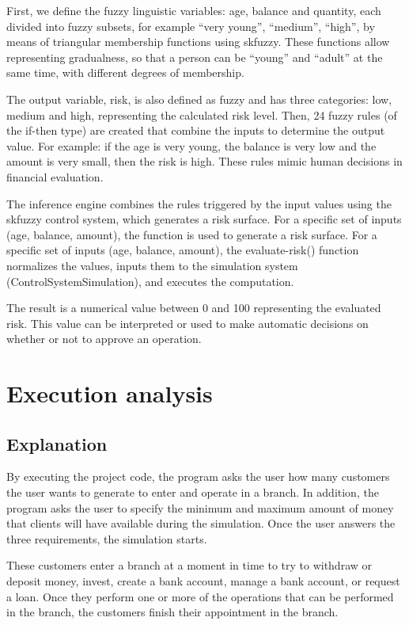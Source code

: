\documentclass[titlepage, 12pt]{article}
\begin{document}
First, we define the fuzzy linguistic variables: age, balance and quantity, each divided into fuzzy subsets, for example “very young”, “medium”, “high”, by means of triangular membership functions using skfuzzy. These functions allow representing gradualness, so that a person can be “young” and “adult” at the same time, with different degrees of membership.

The output variable, risk, is also defined as fuzzy and has three categories: low, medium and high, representing the calculated risk level. Then, 24 fuzzy rules (of the if-then type) are created that combine the inputs to determine the output value. For example: if the age is very young, the balance is very low and the amount is very small, then the risk is high. These rules mimic human decisions in financial evaluation.

The inference engine combines the rules triggered by the input values using the skfuzzy control system, which generates a risk surface. For a specific set of inputs (age, balance, amount), the function is used to generate a risk surface. For a specific set of inputs (age, balance, amount), the evaluate-risk() function normalizes the values, inputs them to the simulation system (ControlSystemSimulation), and executes the computation.

The result is a numerical value between 0 and 100 representing the evaluated risk. This value can be interpreted or used to make automatic decisions on whether or not to approve an operation.

\newpage

\section{Execution analysis}

\subsection{Explanation}
By executing the project code, the program asks the user how many customers the user wants to generate to enter and operate in a branch. In addition, the program asks the user to specify the minimum and maximum amount of money that clients will have available during the simulation. Once the user answers the three requirements, the simulation starts.

These customers enter a branch at a moment in time to try to withdraw or deposit money, invest, create a bank account, manage a bank account, or request a loan. Once they perform one or more of the operations that can be performed in the branch, the customers finish their appointment in the branch.
\end{document}
